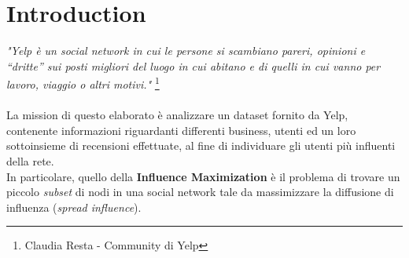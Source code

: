 
\chapter{Introduction} \textit{"Yelp è un social network in cui le persone si
scambiano pareri,  opinioni e “dritte” sui posti migliori del luogo in cui
abitano e di  quelli in cui vanno per lavoro, viaggio o altri motivi."}
\footnote{Claudia Resta - Community di Yelp}\\\\
La mission di questo elaborato è
analizzare un dataset fornito da Yelp,  contenente informazioni riguardanti
differenti business, utenti ed un  loro sottoinsieme di recensioni effettuate,
al fine di individuare gli  utenti più influenti della rete.\\
 In particolare,
quello della \textbf{Influence Maximization} è il  problema di trovare un
piccolo \textit{subset} di nodi in una social  network tale da  massimizzare la
diffusione di influenza  (\textit{spread influence}).
